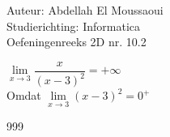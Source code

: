 \documentclass[a4paper]{article}
\begin{document}
  
\noindent \large Auteur: Abdellah El Moussaoui \\
\noindent \large Studierichting: Informatica\\
\noindent \large Oefeningenreeks 2D nr. 10.2\\

\medskip

\normalsize


$\lim\limits_{x\to3}\dfrac{x}{\left(x-3\right)^2}=+\infty$\\

Omdat $\lim\limits_{x\to3} (x-3)^2 = 0^+$\\



\begin{thebibliography}{999}
\end{thebibliography}
\end{document}
